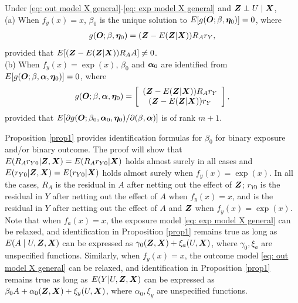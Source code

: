 \documentclass[12pt]{article}
\begin{document}
{\begin{prop} \label{prop1}
	Under \eqref{eq: out model X general}-\eqref{eq: exp model X general} and $ \bm{Z}\perp U\mid \bm{X} $, \\
	(a) When $ f_y(x)=x $, $ \beta_0 $ is the unique solution to $ E[ g(\bm O; \beta, \bm \eta_0) ]=0 $, where 
	\begin{align}
		g(\bm O; \beta, \bm \eta_0) = (\bm{Z}- E(\bm{Z}|\bm{X})) R_A r_Y,  \label{eq: iden binary1}
	\end{align}
	provided that $ E[ (\bm{Z}- E(\bm{Z}|\bm{X})) R_AA ] \neq 0$.\\
	(b) When $ f_y(x)=\exp(x) $, $ \beta_0 $  and $\bm \alpha_0 $ are identified from $ E[ g( \bm O; \beta, \bm \alpha, \bm \eta_0) ] =0 $, where 
	\begin{align}
		g(\bm O; \beta, \bm \alpha, \bm \eta_0)=\left[  \begin{array}{c}
			(\bm{Z}- E(\bm{Z}|\bm{X})) R_A r_Y\\
			(\bm{Z}- E(\bm{Z}|\bm{X})) r_Y
		\end{array} \right], \label{eq: iden binary2}
	\end{align}
	provided that $ E[\partial g(\bm O; \beta_0, \bm \alpha_0, \bm \eta_0) /\partial (\beta, \bm \alpha)] $ is of rank $ m+1 $.
\end{prop}
Proposition \ref{prop1} provides identification formulas for $ \beta_0 $ for binary exposure and/or binary outcome.  The proof will show that $ E(R_Ar_{Y0}|\bm{Z}, \bm{X}) =E(R_Ar_{Y0}|\bm{X})  $ holds almost surely in all cases and $ E(r_{Y0}|\bm{Z}, \bm{X})=E(r_{Y0}| \bm{X})  $ holds almost surely when $ f_y(x)=\exp(x) $. In all the cases, $ R_A $ is the residual in $ A $ after netting out the effect of $ \bm{Z} $; $ r_{Y0} $ is the residual in $ Y $ after netting out the effect of $ A $ when $ f_y(x)=x $, and is the residual in $ Y $ after netting out the effect of $ A $ and $ \bm{Z} $ when $ f_y(x)=\exp(x) $.  Note that  when $ f_a(x)=x $, the exposure model \eqref{eq: exp model X general} can be relaxed,  and   identification in  Proposition \ref{prop1} remains true as long as $ E(A\mid U, \bm{Z}, \bm{X})$ can be expressed as $ \gamma_0(\bm{Z}, \bm{X})+\xi_a(U, \bm{X}) $, where $\gamma_0, \xi_a $ are unspecified functions.  Similarly, when  $ f_y(x)=x $, the outcome model \eqref{eq: out model X general}  can be relaxed, and identification in Proposition \ref{prop1}  remains true as long as $ E(Y|U, \bm{Z}, \bm{X}) $ can be expressed as  $\beta_0A+  \alpha_0(\bm{Z}, \bm{X})+\xi_y(U, \bm{X})$, where $ \alpha_0, \xi_y$ are unspecified functions. 



}
\end{document}
